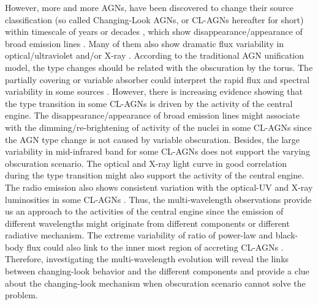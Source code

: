 \documentclass[twocolumn]{aastex63}
\begin{document}
{However, more and more AGNs, have been discovered to change their source classification (so called Changing-Look AGNs, or CL-AGNs hereafter for short) within timescale of years or decades \citep[e.g.][]{2016MNRAS.457..389M, 2016ApJ...826..188R, 2018ApJ...864...27S, 2019ApJ...874....8M,2020MNRAS.491.4925G}, 
which show disappearance/appearance of broad emission lines \citep[e.g.][]{2016MNRAS.457..389M,2019MNRAS.486..123R}. Many of them also show dramatic flux variability in optical/ultraviolet and/or X-ray \citep[e.g.][]{2016MNRAS.461.1927P,2017ApJ...846L...7S,2019MNRAS.483L..88P}. According to the traditional AGN unification model, the type changes should be related with the obscuration by the torus. The partially covering or variable absorber could interpret the rapid flux and spectral variability in some sources \citep[e.g.][]{2013MNRAS.436.1615M,2014MNRAS.443.2862A,2015ApJ...815...55R,2018MNRAS.481.2470T}. However, there is increasing evidence showing that the type transition in some CL-AGNs is driven by the activity of the central engine. The disappearance/appearance of broad emission lines might associate with the dimming/re-brightening of activity of the nuclei in some CL-AGNs \citep[e.g.][]{2014ApJ...796..134D,2018MNRAS.480.3898N,2019ApJ...885...44D} since the AGN type change is not caused by variable obscuration.  Besides, the large variability in mid-infrared band for some CL-AGNs \citep[e.g.][]{2017ApJ...846L...7S} does not support the varying obscuration scenario. The optical and X-ray light curve in good correlation during the type transition might also support the activity of the central engine. The radio emission also shows consistent variation with the optical-UV and X-ray luminosities in some CL-AGNs \citep[e.g.][]{2016MNRAS.460..304K}. Thus, the multi-wavelength observations provide us an approach to the activities of the central engine since the emission of different wavelengths might originate from different components or different radiative mechanism. 
The extreme variability of ratio of power-law and black-body flux could also link to the inner most region of accreting CL-AGNs \citep[e.g.][]{2019ApJ...883...94T,2020ApJ...898L...1R}.
Therefore, investigating the multi-wavelength evolution will reveal the links between changing-look behavior and the different components and provide a clue about the changing-look mechanism when obscuration scenario cannot solve the problem.}
\end{document}
